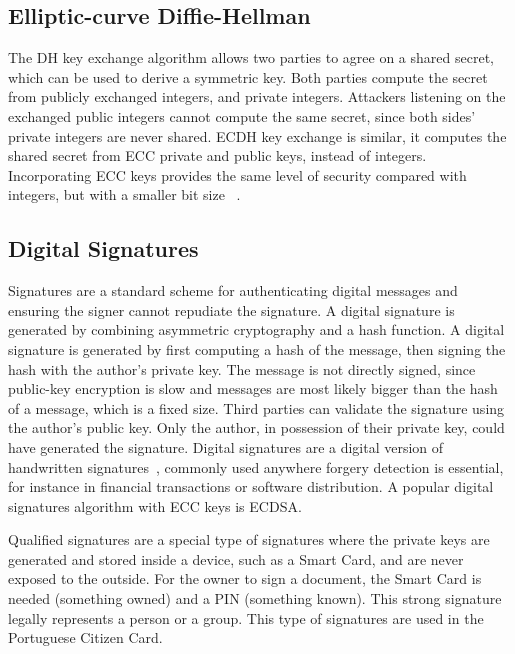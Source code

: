 \subsection{Elliptic-curve Diffie-Hellman}\label{chap:background:crypto:ecdh}

The \ac{DH} key exchange algorithm allows two parties to agree on a shared secret, which can be used to derive a symmetric key. Both parties compute the secret from publicly exchanged integers, and private integers. Attackers listening on the exchanged public integers cannot compute the same secret, since both sides' private integers are never shared.
\ac{ECDH} key exchange is similar, it computes the shared secret from \ac{ECC} private and public keys, instead of integers. Incorporating \ac{ECC} keys provides the same level of security compared with integers, but with a smaller bit size ~\cite{fiskiran2002workload}.

\subsection{Digital Signatures}\label{chap:background:crypto:signatures}

Signatures are a standard scheme for authenticating digital messages and ensuring the signer cannot repudiate the signature. A digital signature is generated by combining asymmetric cryptography and a hash function.
A digital signature is generated by first computing a hash of the message, then signing the hash with the author's private key. The message is not directly signed, since public-key encryption is slow and messages are most likely bigger than the hash of a message, which is a fixed size. Third parties can validate the signature using the author's public key. Only the author, in possession of their private key, could have generated the signature.
Digital signatures are a digital version of handwritten signatures~\cite{digitalsignatures}, commonly used anywhere forgery detection is essential, for instance in financial transactions or software distribution.
A popular digital signatures algorithm with ECC keys is \ac{ECDSA}.

Qualified signatures are a special type of signatures where the private keys are generated and stored inside a device, such as a Smart Card, and are never exposed to the outside. For the owner to sign a document, the Smart Card is needed (something owned) and a \ac{PIN} (something known). This strong signature legally represents a person or a group. This type of signatures are used in the Portuguese Citizen Card.

